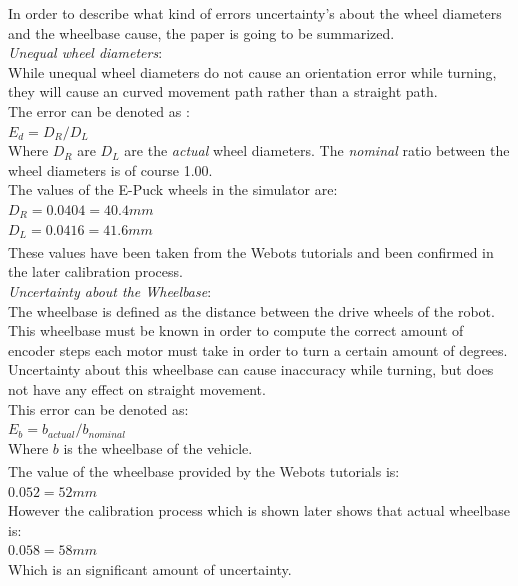 In order to describe what kind of errors uncertainty's about the wheel diameters and the wheelbase cause, the paper is going to be summarized. \\[3ex]

\textit{Unequal wheel diameters}:\\
While unequal wheel diameters do not cause an orientation error while turning, they will cause an curved movement path rather than a straight path.\\
The error can be denoted as :\\
$E_{d} = D_{R} / D_{L}$\\
Where $D_{R}$ are $D_{L}$ are the \textit{actual} wheel diameters. The \textit{nominal} ratio between the wheel diameters is of course 1.00\cite{Borenstein1996Measurement}.\\
The values of the E-Puck wheels in the simulator are:\\
$D_{R} = 0.0404 = 40.4mm$\\
$D_{L} = 0.0416 = 41.6mm$\\
These values have been taken from the Webots\textsuperscript{\texttrademark} tutorials and been confirmed in the later calibration process.\\

\textit{Uncertainty about the Wheelbase}:\\
The wheelbase is defined as the distance between the drive wheels of the robot. This wheelbase must be known in order to compute the correct amount of encoder steps each motor must take in order to turn a certain amount of degrees.
Uncertainty about this wheelbase can cause inaccuracy while turning, but does not have any effect on straight movement.\\
This error can be denoted as:\\
$E_{b} = b_{actual} / b_{nominal}$\\
Where $b$ is the wheelbase of the vehicle\cite{Borenstein1996Measurement}.\\
The value of the wheelbase provided by the Webots\textsuperscript{\texttrademark} tutorials is:\\
$0.052 = 52mm$\\
However the calibration process which is shown later shows that actual wheelbase is:\\
$0.058 = 58mm$\\
Which is an significant amount of uncertainty.\\

